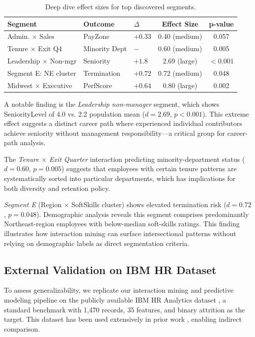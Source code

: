 \documentclass[twocolumn]{article}
\begin{document}
\begin{table}[ht]
\centering
\caption{Deep dive effect sizes for top discovered segments.}
\label{tab:deepdive}
\small
\begin{tabular}{lllcc}
\hline
Segment & Outcome & $\Delta$ & Effect Size & p-value \\
\hline
Admin. $\times$ Sales & PayZone & $+0.33$ & 0.40 (medium) & 0.057 \\
Tenure $\times$ Exit Q4 & Minority Dept & $-$ & 0.60 (medium) & 0.005 \\
Leadership $\times$ Non-mgr & Seniority & $+1.8$ & 2.69 (large) & $<0.001$ \\
Segment E: NE cluster & Termination & $+0.72$ & 0.72 (medium) & 0.048 \\
Midwest $\times$ Executive & PerfScore & $+0.64$ & 0.80 (large) & 0.002 \\
\hline
\end{tabular}
\end{table}

A notable finding is the \textit{Leadership non-manager} segment, which shows SeniorityLevel of 4.0 vs. 2.2 population mean ($d = 2.69$, $p < 0.001$). This extreme effect suggests a distinct career path where experienced individual contributors achieve seniority without management responsibility---a critical group for career-path analysis.

The \textit{Tenure $\times$ Exit Quarter} interaction predicting minority-department status ($d = 0.60$, $p = 0.005$) suggests that employees with certain tenure patterns are systematically sorted into particular departments, which has implications for both diversity and retention policy.

\textit{Segment E} (Region $\times$ SoftSkills cluster) shows elevated termination risk ($d = 0.72$, $p = 0.048$). Demographic analysis reveals this segment comprises predominantly Northeast-region employees with below-median soft-skills ratings. This finding illustrates how interaction mining can surface intersectional patterns without relying on demographic labels as direct segmentation criteria.

\subsection{External Validation on IBM HR Dataset}

To assess generalizability, we replicate our interaction mining and predictive modeling pipeline on the publicly available IBM HR Analytics dataset \cite{ibmhr}, a standard benchmark with 1,470 records, 35 features, and binary attrition as the target. This dataset has been used extensively in prior work \cite{alduayj2020predicting,devos2024predicting,alakasheh2023decade}, enabling indirect comparison.
\end{document}
